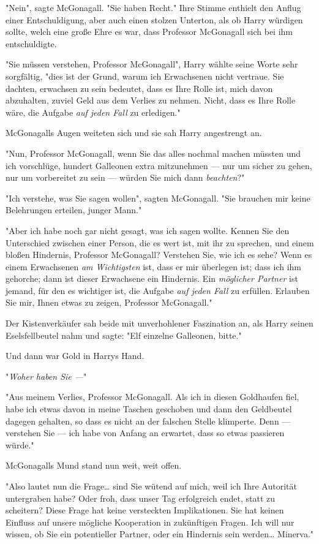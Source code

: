 {"Nein", sagte McGonagall. "Sie haben Recht." Ihre Stimme enthielt den Anflug einer Entschuldigung, aber auch einen stolzen Unterton, als ob Harry würdigen sollte, welch eine große Ehre es war, dass Professor McGonagall sich bei ihm entschuldigte.

"Sie müssen verstehen, Professor McGonagall", Harry wählte seine Worte sehr sorgfältig, "dies ist der Grund, warum ich Erwachsenen nicht vertraue. Sie dachten, erwachsen zu sein bedeutet, dass es Ihre Rolle ist, mich davon abzuhalten, zuviel Geld aus dem Verlies zu nehmen. Nicht, dass es Ihre Rolle wäre, die Aufgabe \emph{auf jeden Fall} zu erledigen."

McGonagalls Augen weiteten sich und sie sah Harry angestrengt an.

"Nun, Professor McGonagall, wenn Sie das alles nochmal machen müssten und ich vorschlüge, hundert Galleonen extra mitzunehmen --- nur um sicher zu gehen, nur um vorbereitet zu sein --- würden Sie mich dann \emph{beachten}?"

"Ich verstehe, was Sie sagen wollen", sagten McGonagall. "Sie brauchen mir keine Belehrungen erteilen, junger Mann."

"Aber ich habe noch gar nicht gesagt, was ich sagen wollte. Kennen Sie den Unterschied zwischen einer Person, die es wert ist, mit ihr zu sprechen, und einem bloßen Hindernis, Professor McGonagall? Verstehen Sie, wie ich es sehe? Wenn es einem Erwachsenen \emph{am Wichtigsten} ist, dass er mir überlegen ist; dass ich ihm gehorche; dann ist dieser Erwachsene ein Hindernis. Ein \emph{möglicher Partner} ist jemand, für den es wichtiger ist, die Aufgabe \emph{auf jeden Fall} zu erfüllen. Erlauben Sie mir, Ihnen etwas zu zeigen, Professor McGonagall."

Der Kistenverkäufer sah beide mit unverhohlener Faszination an, als Harry seinen Eselsfellbeutel nahm und sagte: "Elf einzelne Galleonen, bitte."

Und dann war Gold in Harrys Hand.

"\emph{Woher haben Sie ---}"

"Aus meinem Verlies, Professor McGonagall. Als ich in diesen Goldhaufen fiel, habe ich etwas davon in meine Taschen geschoben und dann den Geldbeutel dagegen gehalten, so dass es nicht an der falschen Stelle klimperte. Denn --- verstehen Sie --- ich habe von Anfang an erwartet, dass so etwas passieren würde."

McGonagalls Mund stand nun weit, weit offen.

"Also lautet nun die Frage… sind Sie wütend auf mich, weil ich Ihre Autorität untergraben habe? Oder froh, dass unser Tag erfolgreich endet, statt zu scheitern? Diese Frage hat keine versteckten Implikationen. Sie hat keinen Einfluss auf unsere mögliche Kooperation in zukünftigen Fragen. Ich will nur wissen, ob Sie ein potentieller Partner, oder ein Hindernis sein werden… Minerva."

}
